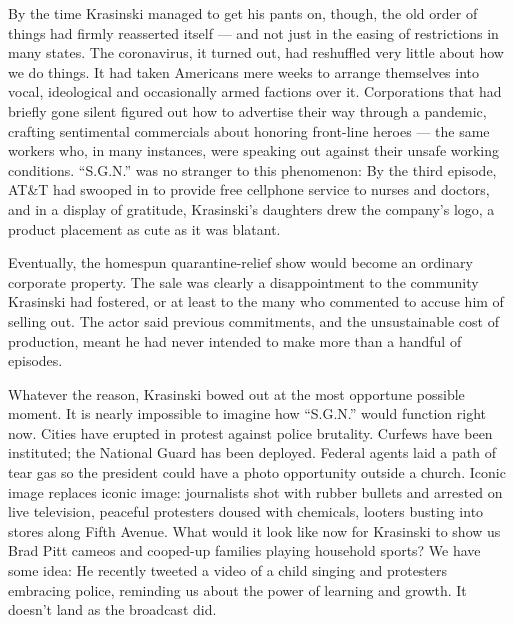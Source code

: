 By the time Krasinski managed to get his pants on, though, the old order
of things had firmly reasserted itself --- and not just in the easing of
restrictions in many states. The coronavirus, it turned out, had
reshuffled very little about how we do things. It had taken Americans
mere weeks to arrange themselves into vocal, ideological and
occasionally armed factions over it. Corporations that had briefly gone
silent figured out how to advertise their way through a pandemic,
crafting sentimental commercials about honoring front-line heroes ---
the same workers who, in many instances, were speaking out against their
unsafe working conditions. ``S.G.N.'' was no stranger to this
phenomenon: By the third episode, AT\&T had swooped in to provide free
cellphone service to nurses and doctors, and in a display of gratitude,
Krasinski's daughters drew the company's logo, a product placement as
cute as it was blatant.

Eventually, the homespun quarantine-relief show would become an ordinary
corporate property. The sale was clearly a disappointment to the
community Krasinski had fostered, or at least to the many who commented
to accuse him of selling out. The actor said previous commitments, and
the unsustainable cost of production, meant he had never intended to
make more than a handful of episodes.

Whatever the reason, Krasinski bowed out at the most opportune possible
moment. It is nearly impossible to imagine how ``S.G.N.'' would function
right now. Cities have erupted in protest against police brutality.
Curfews have been instituted; the National Guard has been deployed.
Federal agents laid a path of tear gas so the president could have a
photo opportunity outside a church. Iconic image replaces iconic image:
journalists shot with rubber bullets and arrested on live television,
peaceful protesters doused with chemicals, looters busting into stores
along Fifth Avenue. What would it look like now for Krasinski to show us
Brad Pitt cameos and cooped-up families playing household sports? We
have some idea: He recently tweeted a video of a child singing and
protesters embracing police, reminding us about the power of learning
and growth. It doesn't land as the broadcast did.

